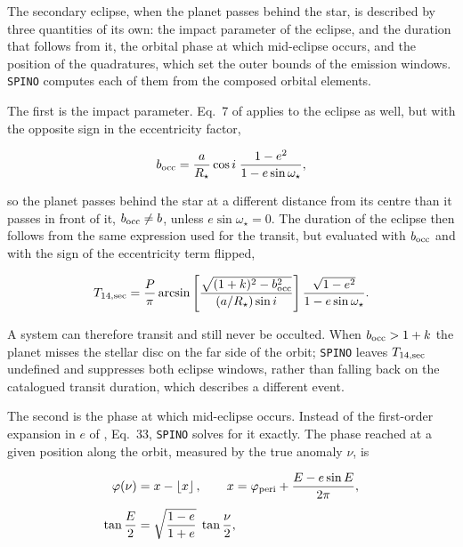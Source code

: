 

The secondary eclipse, when the planet passes behind the star, is described by three quantities of its own: the impact parameter of the eclipse, and the duration that follows from it, the orbital phase at which mid-eclipse occurs, and the position of the quadratures, which set the outer bounds of the emission windows. \texttt{SPINO} computes each of them from the composed orbital elements.

The first is the impact parameter. Eq.~7 of \citet{winn2010} applies to the eclipse as well, but with the opposite sign in the eccentricity factor,

\begin{equation}\label{eq:bocc}
b_{\rm occ} = \frac{a}{R_\star}\cos i \; \frac{1 - e^2}{1 - e \sin\omega_\star},
\end{equation}

so the planet passes behind the star at a different distance from its centre than it passes in front of it, $b_{\rm occ} \ne b$, unless $e \sin\omega_\star = 0$. The duration of the eclipse then follows from the same expression used for the transit, but evaluated with $b_{\rm occ}$ and with the sign of the eccentricity term flipped,

\begin{equation}\label{eq:t14sec}
T_{14,\rm sec} = \frac{P}{\pi} \arcsin\left[\frac{\sqrt{(1+k)^2 - b_{\rm occ}^2}}{(a/R_\star)\sin i}\right] \frac{\sqrt{1-e^2}}{1 - e\sin\omega_\star} .
\end{equation}

A system can therefore transit and still never be occulted. When $b_{\rm occ} > 1 + k$ the planet misses the stellar disc on the far side of the orbit; \texttt{SPINO} leaves $T_{14,\rm sec}$ undefined and suppresses both eclipse windows, rather than falling back on the catalogued transit duration, which describes a different event.

The second is the phase at which mid-eclipse occurs. Instead of the first-order expansion in $e$ of \citet{winn2010}, Eq.~33, \texttt{SPINO} solves for it exactly. The phase reached at a given position along the orbit, measured by the true anomaly $\nu$, is

\begin{equation}\label{eq:phaseofnu}
\begin{aligned}
\varphi(\nu) &= x - \left\lfloor x \right\rfloor ,
\qquad x = \varphi_{\rm peri} + \frac{E - e\sin E}{2\pi} , \\[4pt]
\tan\frac{E}{2} &= \sqrt{\frac{1-e}{1+e}}\;\tan\frac{\nu}{2} ,
\end{aligned}
\end{equation}

